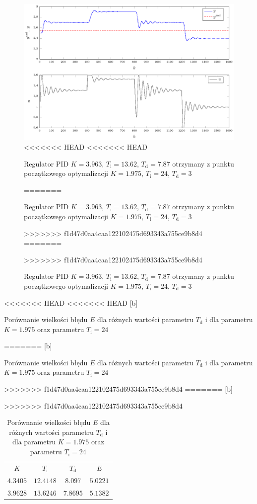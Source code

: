 \begin{figure}[tb] 
\centering 
\includegraphics[scale=1]{rysunki/zapisz_pdf/PID_K=3.963_Ti=13.62_Td=7.87.pdf} 
<<<<<<< HEAD
<<<<<<< HEAD
\caption{Regulator PID $K=\num{3.963}$, $T_{\mathrm{i}}=\num{13.62}$, $T_{\mathrm{d}}=\num{7.87}$ otrzymany z punktu początkowego optymalizacji $K=\num{1.975}$, $T_{\mathrm{i}}=24$, $T_{\mathrm{d}}=3$} 
=======
\caption{Regulator PID $K=\num{3.963}$, $T_{\mathrm{i}}=13.62$, $T_{\mathrm{d}}=7.87$ otrzymany z punktu początkowego optymalizacji $K=\num{1.975}$, $T_{\mathrm{i}}=24$, $T_{\mathrm{d}}=3$} 
>>>>>>> f1d47d0aa4caa122102475d693343a755ce9b8d4
=======
\caption{Regulator PID $K=\num{3.963}$, $T_{\mathrm{i}}=13.62$, $T_{\mathrm{d}}=7.87$ otrzymany z punktu początkowego optymalizacji $K=\num{1.975}$, $T_{\mathrm{i}}=24$, $T_{\mathrm{d}}=3$} 
>>>>>>> f1d47d0aa4caa122102475d693343a755ce9b8d4
\label{r_pgfplots_PID_K=3.963_Ti=13.62_Td=7.87} 
\end{figure}




\begin{table}
<<<<<<< HEAD
<<<<<<< HEAD
	[b] \caption{Porównanie wielkości błędu $E$ dla różnych wartości parametru $T_{\mathrm{d}}$ i dla parametru $K=\num{1.975}$ oraz parametru $T_{\mathrm{i}}=24$}
=======
	[b] \caption{Porównanie wielkości błędu $E$ dla różnych wartości parametru $T_{\mathrm{d}}$ i dla parametru $K=1.975$ oraz parametru $T_{\mathrm{i}}=24$}
>>>>>>> f1d47d0aa4caa122102475d693343a755ce9b8d4
=======
	[b] \caption{Porównanie wielkości błędu $E$ dla różnych wartości parametru $T_{\mathrm{d}}$ i dla parametru $K=1.975$ oraz parametru $T_{\mathrm{i}}=24$}
>>>>>>> f1d47d0aa4caa122102475d693343a755ce9b8d4
	\label{t_T_i}
	\centering
	\begin{small}
		\begin{tabular}{|c|c|c|c|}
			\hline
			$K$					&	$T_{\mathrm{i}}$	&	$T_{\mathrm{d}}$	&	$E$				\\
			$\num{4.3405}$		&	$\num{12.4148}$	&	$\num{8.097}$		&	$\num{5.0221}$	\\
			$\num{3.9628}$		&	$\num{13.6246}$	&	$\num{7.8695}$		&	$\num{5.1382}$	\\
			\hline
			\end{tabular}
	\end{small}
\end{table}

